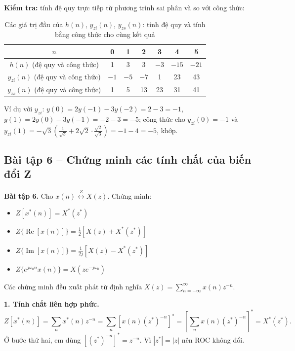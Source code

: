 \documentclass[12pt,a4paper]{article}
\newcommand{\zpair}{\overset{Z}{\longleftrightarrow}}
\begin{document}
\textbf{Kiểm tra:} tính đệ quy trực tiếp từ phương trình sai phân và so với công thức:
\begin{table}[H]
\centering
\begin{tabular}{c|cccccc}
\toprule
$n$ & 0 & 1 & 2 & 3 & 4 & 5 \\
\midrule
$h(n)$ (đệ quy và công thức) & 1 & 3 & 3 & $-3$ & $-15$ & $-21$ \\
$y_{zi}(n)$ (đệ quy và công thức) & $-1$ & $-5$ & $-7$ & 1 & 23 & 43 \\
$y_{zs}(n)$ (đệ quy và công thức) & 1 & 5 & 13 & 23 & 31 & 41 \\
\bottomrule
\end{tabular}
\caption{Các giá trị đầu của $h(n)$, $y_{zi}(n)$, $y_{zs}(n)$: tính đệ quy và tính bằng công thức cho cùng kết quả}
\end{table}
\noindent Ví dụ với $y_{zi}$: $y(0) = 2y(-1) - 3y(-2) = 2 - 3 = -1$, $y(1) = 2y(0) - 3y(-1) = -2 - 3 = -5$; công thức cho $y_{zi}(0) = -1$ và $y_{zi}(1) = -\sqrt{3}\left(\frac{1}{\sqrt{3}} + 2\sqrt{2} \cdot \frac{\sqrt{2}}{\sqrt{3}}\right) = -1 - 4 = -5$, khớp.

\subsection{Bài tập 6 -- Chứng minh các tính chất của biến đổi Z}
\begin{mdframed}[style=exbox]
\noindent\textbf{Bài tập 6.} Cho $x(n) \zpair X(z)$. Chứng minh:
\begin{itemize}
    \item $Z[x^*(n)] = X^*(z^*)$
    \item $Z\{\operatorname{Re}[x(n)]\} = \frac{1}{2}\left[X(z) + X^*(z^*)\right]$
    \item $Z\{\operatorname{Im}[x(n)]\} = \frac{1}{2j}\left[X(z) - X^*(z^*)\right]$
    \item $Z\{e^{j\omega_0 n} x(n)\} = X(z e^{-j\omega_0})$
\end{itemize}
\end{mdframed}

Các chứng minh đều xuất phát từ định nghĩa $X(z) = \sum_{n=-\infty}^{\infty} x(n) z^{-n}$.

\textbf{1. Tính chất liên hợp phức.}
\[
    Z[x^*(n)] = \sum_{n} x^*(n) z^{-n} = \sum_{n} \left[x(n) (z^*)^{-n}\right]^* = \left[\sum_{n} x(n) (z^*)^{-n}\right]^* = X^*(z^*).
\]
Ở bước thứ hai, em dùng $\left[(z^*)^{-n}\right]^* = z^{-n}$. Vì $|z^*| = |z|$ nên ROC không đổi.
\end{document}
